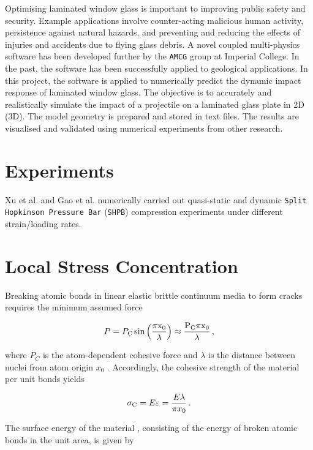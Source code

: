 \documentclass[12pt,twoside]{article}
\begin{document}
Optimising laminated window glass is important to improving public safety and security. Example applications involve counter-acting malicious human activity, persistence against natural hazards, and preventing and reducing the effects of injuries and accidents due to flying glass debris. A novel coupled multi-physics software has been developed further by the \texttt{AMCG} group at Imperial College. In the past, the software has been successfully applied to geological applications. In this project, the software is applied to numerically predict the dynamic impact response of laminated window glass. The objective is to accurately and realistically simulate the impact of a projectile on a laminated glass plate in 2D (3D). The model geometry is prepared and stored in text files. The results are visualised and validated using numerical experiments from other research.

\section{Experiments}

Xu et al. \cite{Xu11} and Gao et al. \cite{Gao14} numerically carried out quasi-static and dynamic \texttt{Split Hopkinson Pressure Bar} (\texttt{SHPB}) compression experiments under different strain/loading rates. 

\section{Local Stress Concentration}

Breaking atomic bonds in linear elastic brittle continuum media to form cracks requires the minimum assumed force

\begin{equation}
\label{eq:minforce}
    P = P_{\rm{C}}\,\rm{sin}\left(\frac{\pi x_{\rm{0}}}{\lambda}\right)\approx \frac{P_{\rm{C}}\pi x_{\rm{0}}}{\lambda}\,,
\end{equation}

where $P_C$ is the atom-dependent cohesive force and $\lambda$ is the distance between nuclei from atom origin $x_0$ \cite{And05}. Accordingly, the cohesive strength of the material per unit bonds \cite{And05} yields

\begin{equation}
\label{eq:cohesivestrength}
    \sigma_{\rm{C}}=E\varepsilon=\frac{E\lambda}{\pi x_{\rm{0}}} \,.
\end{equation}

The surface energy of the material \cite{And05}, consisting of the energy of broken atomic bonds in the unit area, is given by
\end{document}
